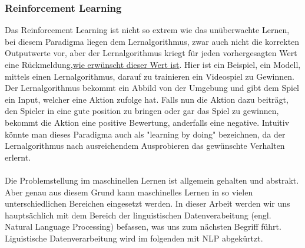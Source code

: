 \documentclass[12pt,letterpaper,ngerman]{article}
\begin{document}
\subsubsection{Reinforcement Learning}
Das Reinforcement Learning ist nicht so extrem wie das unüberwachte Lernen,
bei diesem Paradigma liegen dem Lernalgorithmus, zwar auch nicht die korrekten
Outputwerte vor, aber der Lernalgorithmus kriegt für jeden vorhergesagten Wert
eine Rückmeldung,\underline{wie erwünscht dieser Wert ist}. Hier ist ein Beispiel,
ein Modell, mittels einen Lernalgorithmus, darauf zu trainieren ein Videospiel
zu Gewinnen. Der Lernalgorithmus bekommt ein Abbild von der Umgebung und gibt dem
Spiel ein Input, welcher eine Aktion zufolge hat. Falls nun die Aktion dazu beiträgt, 
den Spieler in eine gute position zu bringen oder gar das Spiel zu gewinnen, bekommt 
die Aktion eine positive Bewertung, anderfalls eine negative. Intuitiv 
könnte man dieses Paradigma auch als "learning by doing" bezeichnen, da
der Lernalgorithmus nach ausreichendem Ausprobieren das gewünschte 
Verhalten erlernt.\\\\
Die Problemstellung im maschinellen Lernen ist allgemein gehalten und abstrakt.
Aber genau aus diesem Grund kann maschinelles Lernen in so vielen unterschiedlichen
Bereichen eingesetzt werden. In dieser Arbeit werden wir uns hauptsächlich 
mit dem Bereich der linguistischen Datenverabeitung 
(engl. Natural Language Processing) befassen, was uns zum nächsten Begriff
führt. Liguistische Datenverarbeitung wird im folgenden mit NLP abgekürtzt.
\pagebreak
\end{document}

